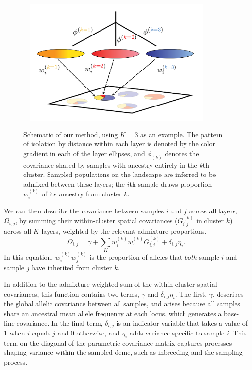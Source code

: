 \documentclass[12pt]{article}
\begin{document}
\begin{figure}
	\centering
		{\includegraphics[width=4in,height=2.5in]{figs/schematic/method_schematic.png}}
		\caption{Schematic of our method, using $K=3$ as an example.
			     The pattern of isolation by distance within each layer is denoted by the color gradient in each of the layer ellipses, 
			     and $\phi_{(k)}$ denotes the covariance shared by samples with ancestry entirely in the $k$th cluster.
			     Sampled populations on the landscape are inferred to be admixed between these layers; 
			     the $i$th sample draws proportion $w^{(k)}_i$ of its ancestry from cluster $k$.
			    }\label{sim_setup}
\end{figure}

We can then describe the covariance between samples $i$ and $j$ across all layers, $\Omega_{i,j}$,
by summing their within-cluster spatial covariances ($G_{i,j}^{(k)}$ in cluster $k$) across all $K$ layers,
weighted by the relevant admixture proportions.
\begin{equation}
\Omega_{i,j} = \gamma + \sum\limits_K w^{(k)}_i w^{(k)}_j
G^{(k)}_{i,j} + \delta_{i,j}\eta_i .
\label{cross_cluster_covariance}
\end{equation}
In this equation, $w^{(k)}_i w^{(k)}_j$ is the proportion of alleles that \emph{both}
sample $i$ and sample $j$ have inherited from cluster $k$.

In addition to the admixture-weighted sum of the within-cluster spatial covariances,
this function contains two terms, $\gamma$ and $\delta_{i,j}\eta_i$.
The first, $\gamma$, describes the global allelic covariance between all samples, 
and arises because all samples share an ancestral mean allele frequency at each locus,
which generates a base-line covariance.
In the final term, $\delta_{i,j}$ is an indicator variable that takes a value of 1 when $i$ equals $j$ and 0 otherwise,
and $\eta_i$ adds variance specific to sample $i$.
This term on the diagonal of the parametric covariance matrix captures processes shaping variance within the sampled deme, 
such as inbreeding and the sampling process.
\end{document}

